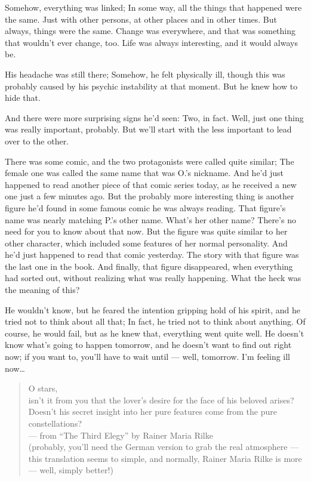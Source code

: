 Somehow, everything was linked; In some way, all the things that happened were the same. 
Just with other persons, at other places and in other times. 
But always, things were the same. 
Change was everywhere, and that was something that wouldn't ever change, too. 
Life was always interesting, and it would always be. 

His headache was still there; Somehow, he felt physically ill, though this was probably caused by his psychic instability at that moment. 
But he knew how to hide that. 

And there were more surprising signs he'd seen: Two, in fact. 
Well, just one thing was really important, probably. 
But we'll start with the less important to lead over to the other.

There was some comic, and the two protagonists were called quite similar; The female one was called the same name that was O.'s nickname. 
And he'd just happened to read another piece of that comic series today, as he received a new one just a few minutes ago. 
But the probably more interesting thing is another figure he'd found in some famous comic he was always reading. 
That figure's name was nearly matching P.'s other name. 
What's her other name? There's no need for you to know about that now. 
But the figure was quite similar to her other character, which included some features of her normal personality. 
And he'd just happened to read that comic yesterday.
The story with that figure was the last one in the book. 
And finally, that figure disappeared, when everything had sorted out, without realizing what was really happening. 
What the heck was the meaning of this?

He wouldn't know, but he feared the intention gripping hold of his spirit, and he tried not to think about all that; In fact, he tried not to think about anything. 
Of course, he would fail, but as he knew that, everything went quite well.
He doesn't know what's going to happen tomorrow, and he doesn't want to find out right now; if you want to, you'll have to wait until --- well, tomorrow. 
I'm feeling ill now\dots{}

\begin{quote}
O stars,\\
isn't it from you that the lover's desire for the face of his beloved arises? Doesn't 
his secret insight into her pure features come from the pure constellations?\\
--- from \enquote{The Third Elegy} by Rainer Maria Rilke\\
(probably, you'll need the German version to grab the real atmosphere --- this translation seems to simple, and normally, Rainer Maria Rilke is more --- well, simply better!)
\end{quote}

